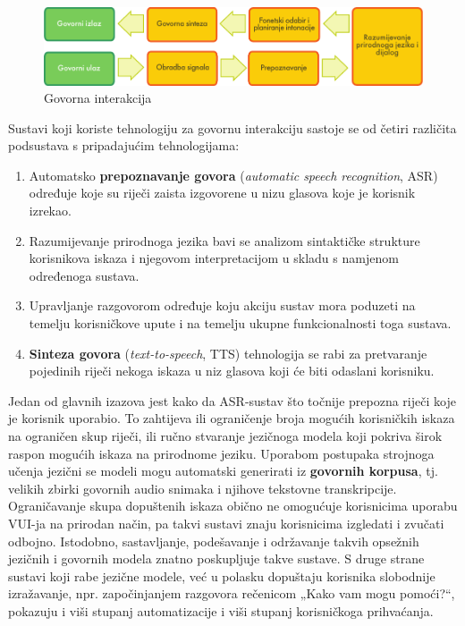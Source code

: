 \begin{multicols}{2}
\begin{figure}[htb]
  \center 
  \includegraphics[width=\textwidth]{../_media/croatian/simple_speech-based_dialogue_architecture}
  \caption{Govorna interakcija}
  \label{fig:dialoguearch_cro}
\end{figure}

Sustavi koji koriste tehnologiju za govornu interakciju sastoje se od četiri različita podsustava s pripadajućim tehnologijama:

\begin{enumerate}
\item Automatsko \textbf{prepoznavanje govora} (\emph{automatic speech recognition}, ASR) određuje koje su riječi zaista izgovorene u nizu glasova koje je korisnik izrekao.
\item Razumijevanje prirodnoga jezika bavi se analizom sintaktičke strukture korisnikova iskaza i njegovom interpretacijom u skladu s namjenom određenoga sustava.
\item Upravljanje razgovorom određuje koju akciju sustav mora poduzeti na temelju korisničkove upute i na temelju ukupne funkcionalnosti toga sustava.
\item \textbf{Sinteza govora} (\emph{text-to-speech}, TTS) tehnologija se rabi za pretvaranje pojedinih riječi nekoga iskaza u niz glasova koji će biti odaslani korisniku. 
\end{enumerate}

Jedan od glavnih izazova jest kako da ASR-sustav što točnije prepozna riječi koje je korisnik uporabio. To zahtijeva ili ograničenje broja mogućih korisničkih iskaza na ograničen skup riječi, ili ručno stvaranje jezičnoga modela koji pokriva širok raspon mogućih iskaza na prirodnome jeziku. Uporabom postupaka strojnoga učenja jezični se modeli mogu automatski generirati iz \textbf{govornih korpusa}, tj. velikih zbirki govornih audio snimaka i njihove tekstovne transkripcije. Ograničavanje skupa dopuštenih iskaza obično ne omogućuje korisnicima uporabu VUI-ja na prirodan način, pa takvi sustavi znaju korisnicima izgledati i zvučati odbojno. Istodobno, sastavljanje, podešavanje i održavanje takvih opsežnih jezičnih i govornih modela znatno poskupljuje takve sustave. S druge strane sustavi koji rabe jezične modele, već u polasku dopuštaju korisnika slobodnije izražavanje, npr. započinjanjem razgovora rečenicom „Kako vam mogu pomoći?“, pokazuju i viši stupanj automatizacije i viši stupanj korisničkoga prihvaćanja.


\end{multicols}

